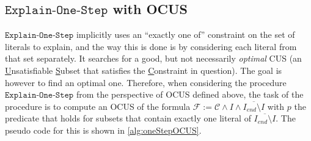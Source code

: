 \documentclass[a4paper,UKenglish,cleveref, autoref, thm-restate, pdfa]{lipics-v2021}
\newcommand\m[1]{\mathcal{#1}}
\renewcommand\comment[1]{}
\newcommand{\emilio}[1]{{\comment{\color{red}Emilio: #1}}}
\newcommand{\bart}[1]{{\comment{\color{OliveGreen}Bart: #1}}}
\newcommand\Iend{\ensuremath{I_\mathit{end} }\xspace}
\newcommand\formula{\ensuremath{\m{F} }\xspace}
\newcommand\formulac{\ensuremath{\m{C} }\xspace}
\newcommand\mm[1]{\ensuremath{#1}\xspace}
\newcommand\call[1]{\mm{\texttt{#1}}}
\newcommand\onestep{\ensuremath{\call{Explain-One-Step}}\xspace}
\begin{document}
	
	\subsection{\onestep with OCUS}
	\onestep implicitly uses an ``exactly one of'' constraint on the set of literals to explain, and the way this is done is by considering each literal from that set separately. It searches for a good, but not necessarily \emph{optimal} CUS (an \underline{U}nsatisfiable \underline{S}ubset that satisfies the \underline{C}onstraint in question). The goal is however to find an optimal one.
	Therefore, when considering the procedure \onestep from the perspective of OCUS defined above, the task of the procedure is to compute an OCUS of the formula $\formula := \formulac\land I\land \overline{\Iend\setminus I}$ with $p$ the predicate that holds for subsets that contain exactly one literal of $\overline{\Iend\setminus I}$. The pseudo code for this is shown in \cref{alg:oneStepOCUS}.
	
\end{document}
